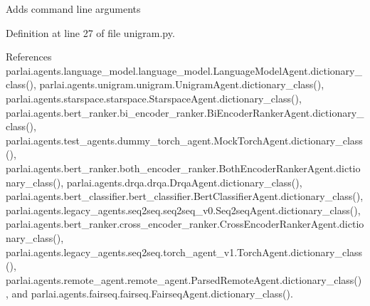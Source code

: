 \begin{DoxyVerb}Adds command line arguments
\end{DoxyVerb}
 

Definition at line 27 of file unigram.\+py.



References parlai.\+agents.\+language\+\_\+model.\+language\+\_\+model.\+Language\+Model\+Agent.\+dictionary\+\_\+class(), parlai.\+agents.\+unigram.\+unigram.\+Unigram\+Agent.\+dictionary\+\_\+class(), parlai.\+agents.\+starspace.\+starspace.\+Starspace\+Agent.\+dictionary\+\_\+class(), parlai.\+agents.\+bert\+\_\+ranker.\+bi\+\_\+encoder\+\_\+ranker.\+Bi\+Encoder\+Ranker\+Agent.\+dictionary\+\_\+class(), parlai.\+agents.\+test\+\_\+agents.\+dummy\+\_\+torch\+\_\+agent.\+Mock\+Torch\+Agent.\+dictionary\+\_\+class(), parlai.\+agents.\+bert\+\_\+ranker.\+both\+\_\+encoder\+\_\+ranker.\+Both\+Encoder\+Ranker\+Agent.\+dictionary\+\_\+class(), parlai.\+agents.\+drqa.\+drqa.\+Drqa\+Agent.\+dictionary\+\_\+class(), parlai.\+agents.\+bert\+\_\+classifier.\+bert\+\_\+classifier.\+Bert\+Classifier\+Agent.\+dictionary\+\_\+class(), parlai.\+agents.\+legacy\+\_\+agents.\+seq2seq.\+seq2seq\+\_\+v0.\+Seq2seq\+Agent.\+dictionary\+\_\+class(), parlai.\+agents.\+bert\+\_\+ranker.\+cross\+\_\+encoder\+\_\+ranker.\+Cross\+Encoder\+Ranker\+Agent.\+dictionary\+\_\+class(), parlai.\+agents.\+legacy\+\_\+agents.\+seq2seq.\+torch\+\_\+agent\+\_\+v1.\+Torch\+Agent.\+dictionary\+\_\+class(), parlai.\+agents.\+remote\+\_\+agent.\+remote\+\_\+agent.\+Parsed\+Remote\+Agent.\+dictionary\+\_\+class(), and parlai.\+agents.\+fairseq.\+fairseq.\+Fairseq\+Agent.\+dictionary\+\_\+class().

